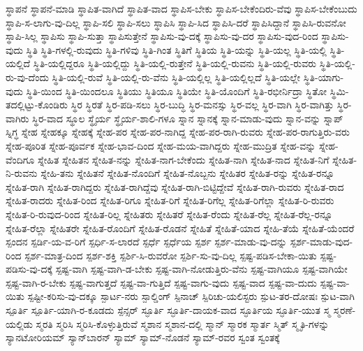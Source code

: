 {ಸ್ಥಾಪನೆ
ಸ್ಥಾಪನೆ-ಮಾಡಿ
ಸ್ಥಾಪಿತ-ವಾಗಿದೆ
ಸ್ಥಾಪಿತ-ವಾದ
ಸ್ಥಾಪಿಸ-ಬೇಕು
ಸ್ಥಾಪಿಸ-ಬೇಕೆಂದಿರು-ವೆವು
ಸ್ಥಾಪಿಸ-ಬೇಕೆಂಬುದು
ಸ್ಥಾಪಿ-ಸ-ಲಾಗು-ವು-ದಿಲ್ಲ
ಸ್ಥಾಪಿ-ಸಲಿ
ಸ್ಥಾಪಿ-ಸಲು
ಸ್ಥಾಪಿಸಿ
ಸ್ಥಾಪಿ-ಸಿದ
ಸ್ಥಾಪಿಸಿ-ದರೆ
ಸ್ಥಾಪಿಸಿದ್ದಾನೆ
ಸ್ಥಾಪಿಸಿ-ರುವನೋ
ಸ್ಥಾಪಿ-ಸಿಲ್ಲ
ಸ್ಥಾಪಿಸು
ಸ್ಥಾಪಿ-ಸುತ್ತಾ
ಸ್ಥಾಪಿಸುತ್ತೇನೆ
ಸ್ಥಾಪಿಸು-ವು-ದಕ್ಕೆ
ಸ್ಥಾಪಿಸು-ವು-ದರ
ಸ್ಥಾಪಿಸು-ವುದ-ರಿಂದ
ಸ್ಥಾಪಿಸು-ವುದು
ಸ್ಥಿತಿ
ಸ್ಥಿತಿ-ಗಳಲ್ಲಿ-ರುವುದು
ಸ್ಥಿತಿ-ಗಳಿವು
ಸ್ಥಿತಿ-ಗಿಂತ
ಸ್ಥಿತಿಗೆ
ಸ್ಥಿತಿಯ
ಸ್ಥಿತಿ-ಯನ್ನು
ಸ್ಥಿತಿ-ಯಲ್ಲ
ಸ್ಥಿತಿ-ಯಲ್ಲಿ
ಸ್ಥಿತಿ-ಯಲ್ಲಿದೆ
ಸ್ಥಿತಿ-ಯಲ್ಲಿದ್ದರೂ
ಸ್ಥಿತಿ-ಯಲ್ಲಿದ್ದು
ಸ್ಥಿತಿ-ಯಲ್ಲಿ-ರುತ್ತೇನೆ
ಸ್ಥಿತಿ-ಯಲ್ಲಿ-ರುವನು
ಸ್ಥಿತಿ-ಯಲ್ಲಿ-ರುವರು
ಸ್ಥಿತಿ-ಯಲ್ಲಿ-ರು-ವು-ದೆಂದು
ಸ್ಥಿತಿ-ಯಲ್ಲಿ-ರುವೆ
ಸ್ಥಿತಿ-ಯಲ್ಲಿ-ರು-ವೆನು
ಸ್ಥಿತಿ-ಯಲ್ಲಿಲ್ಲ
ಸ್ಥಿತಿ-ಯಲ್ಲಿಲ್ಲದೆ
ಸ್ಥಿತಿ-ಯಲ್ಲೇ
ಸ್ಥಿತಿ-ಯಾಗು-ವುದು
ಸ್ಥಿತಿ-ಯಿಂದ
ಸ್ಥಿತಿ-ಯಿಂದಲೂ
ಸ್ಥಿತಿಯು
ಸ್ಥಿತಿಯೂ
ಸ್ಥಿತಿಯೇ
ಸ್ಥಿತಿ-ಯೊಂದಿಗೆ
ಸ್ಥಿತಿ-ರಭೀರ್ನಿದ್ರಾ
ಸ್ಥಿತೋ
ಸ್ಥಿಮಿ-ತದಲ್ಲಿಟ್ಟು-ಕೊಂಡಿರು
ಸ್ಥಿರ
ಸ್ಥಿರತೆ
ಸ್ಥಿರ-ಪಡಿ-ಸಲು
ಸ್ಥಿರ-ಬುದ್ಧಿ
ಸ್ಥಿರ-ಮನಸ್ಸು
ಸ್ಥಿರ-ವಲ್ಲ
ಸ್ಥಿರ-ವಾಗಿ
ಸ್ಥಿರ-ವಾಗಿತ್ತು
ಸ್ಥಿರ-ವಾಗಿರು
ಸ್ಥಿರ-ವಾದ
ಸ್ಥೂಲ
ಸ್ಥೈರ್ಯ
ಸ್ಥೈರ್ಯ-ಶಾಲಿ-ಗಳೂ
ಸ್ನಾನ
ಸ್ನಾನಕ್ಕೆ
ಸ್ನಾನ-ಮಾಡು-ವುದು
ಸ್ನಾನ-ವನ್ನು
ಸ್ನಾಪ್
ಸ್ನಿಗ್ಧ
ಸ್ನೇಹ
ಸ್ನೇಹಕ್ಕೂ
ಸ್ನೇಹಕ್ಕೆ
ಸ್ನೇಹ-ಪರ
ಸ್ನೇಹ-ಪರ-ನಾಗಿದ್ದ
ಸ್ನೇಹ-ಪರ-ರಾಗಿ-ರುವರು
ಸ್ನೇಹ-ಪರ-ರಾಗುತ್ತಿರು-ವರು
ಸ್ನೇಹ-ಪೂರಿತ
ಸ್ನೇಹ-ಪೂರ್ವಕ
ಸ್ನೇಹ-ಭಾವ-ದಿಂದ
ಸ್ನೇಹ-ಮಯ-ವಾಗಿದ್ದರು
ಸ್ನೇಹ-ಮುದ್ರಿತ
ಸ್ನೇಹ-ವನ್ನು
ಸ್ನೇಹ-ವೆಂದಿಗೂ
ಸ್ನೇಹಿತ
ಸ್ನೇಹಿತನ
ಸ್ನೇಹಿತ-ನನ್ನು
ಸ್ನೇಹಿತ-ನಾಗ-ಬೇಕೆಂದು
ಸ್ನೇಹಿತ-ನಾಗಿ
ಸ್ನೇಹಿತ-ನಾದ
ಸ್ನೇಹಿತ-ನಿಗೆ
ಸ್ನೇಹಿತ-ನಿ-ರುವನು
ಸ್ನೇಹಿ-ತನು
ಸ್ನೇಹಿತನೆ
ಸ್ನೇಹಿತ-ನೊಂದಿಗೆ
ಸ್ನೇಹಿತ-ನೊಬ್ಬನು
ಸ್ನೇಹಿತರ
ಸ್ನೇಹಿತ-ರನ್ನು
ಸ್ನೇಹಿತ-ರನ್ನೂ
ಸ್ನೇಹಿತ-ರಾಗಿ
ಸ್ನೇಹಿತ-ರಾಗಿದ್ದರು
ಸ್ನೇಹಿತ-ರಾಗಿದ್ದೆವು
ಸ್ನೇಹಿತ-ರಾಗಿ-ಬಿಟ್ಟಿದ್ದೇವೆ
ಸ್ನೇಹಿತ-ರಾಗಿ-ರುವರು
ಸ್ನೇಹಿತ-ರಾದ
ಸ್ನೇಹಿತ-ರಾದರು
ಸ್ನೇಹಿತ-ರಿಂದ
ಸ್ನೇಹಿತ-ರಿಗೂ
ಸ್ನೇಹಿತ-ರಿಗೆ
ಸ್ನೇಹಿತ-ರಿಗೆಲ್ಲ
ಸ್ನೇಹಿತ-ರಿಗೆಲ್ಲಾ
ಸ್ನೇಹಿತ-ರಿ-ರುವರು
ಸ್ನೇಹಿತ-ರಿ-ರುವುದ-ರಿಂದ
ಸ್ನೇಹಿತ-ರಿಲ್ಲ
ಸ್ನೇಹಿತರು
ಸ್ನೇಹಿತರೆ
ಸ್ನೇಹಿತ-ರೆಂದು
ಸ್ನೇಹಿತ-ರೆಲ್ಲ
ಸ್ನೇಹಿತ-ರೆಲ್ಲ-ರನ್ನೂ
ಸ್ನೇಹಿತ-ರೆಲ್ಲಾ
ಸ್ನೇಹಿತರೇ
ಸ್ನೇಹಿತ-ರೊಂದಿಗೆ
ಸ್ನೇಹಿತ-ರೊಡನೆ
ಸ್ನೇಹಿತೆ
ಸ್ನೇಹಿತೆ-ಯಾದ
ಸ್ನೇಹಿ-ತೆಯೆ
ಸ್ನೇಹಿತೆ-ಯೆಂದರೆ
ಸ್ಪಂದನ
ಸ್ಪರ್ಡಿ-ಯ-ವ-ರಿಗೆ
ಸ್ಪರ್ಧಿ-ಸ-ಲಾರದೆ
ಸ್ಪರ್ಧೆ
ಸ್ಪರ್ಧೆಯ
ಸ್ಪರ್ಶ
ಸ್ಪರ್ಶ-ಮಾಡು-ವು-ದನ್ನು
ಸ್ಪರ್ಶ-ಮಾಡು-ವುದ-ರಿಂದ
ಸ್ಪರ್ಶ-ಮಾತ್ರ-ದಿಂದ
ಸ್ಪರ್ಶ-ಶಕ್ತಿ
ಸ್ಪರ್ಶಿ-ಸಿ-ರುವರೋ
ಸ್ಪರ್ಶಿ-ಸು-ವು-ದಿಲ್ಲ
ಸ್ಪಷ್ಟ-ಪಡಿಸ-ಬೇಕಾ-ಯಿತು
ಸ್ಪಷ್ಟ-ಪಡಿಸು-ವು-ದಕ್ಕೆ
ಸ್ಪಷ್ಟ-ವಾಗಿ
ಸ್ಪಷ್ಟ-ವಾಗಿ-ಡ-ಬೇಕು
ಸ್ಪಷ್ಟ-ವಾಗಿ-ನೋಡುತ್ತಿರು-ವೆನು
ಸ್ಪಷ್ಟ-ವಾಗಿಯೂ
ಸ್ಪಷ್ಟ-ವಾಗಿಯೇ
ಸ್ಪಷ್ಟ-ವಾಗಿ-ರ-ಬೇಕು
ಸ್ಪಷ್ಟ-ವಾಗುತ್ತದೆ
ಸ್ಪಷ್ಟ-ವಾ-ಗುತ್ತಿದೆ
ಸ್ಪಷ್ಟ-ವಾಗು-ವುದು
ಸ್ಪಷ್ಟ-ವಾದ
ಸ್ಪಷ್ಟ-ವಾ-ದುದು
ಸ್ಪಷ್ಟ-ವಾ-ಯಿತು
ಸ್ಪಷ್ಟೀ-ಕರಿಸು-ವು-ದಕ್ಕೂ
ಸ್ಪಾರ್ಟ-ನರು
ಸ್ಪಾಲ್ಡಿಂಗ್
ಸ್ಪಿನಾಚ್
ಸ್ಪಿರಿಚು-ಯಲಿಸ್ಟರು
ಸ್ಪುಟ-ತರ-ದೋಷಃ
ಸ್ಪುಟ-ವಾಗಿ
ಸ್ಪೂರ್ತಿ
ಸ್ಪೂರ್ತಿ-ಯಾಗಿ-ರ-ಕೂಡದು
ಸ್ಪೆನ್ಸರ್
ಸ್ಫೂರ್ತಿ
ಸ್ಫೂರ್ತಿ-ದಾಯಕ-ವಾದ
ಸ್ಫೂರ್ತಿಯ
ಸ್ಫೂರ್ತಿ-ಯುತ
ಸ್ಮ
ಸ್ಮರಣೆ-ಯಲ್ಲಿಡು
ಸ್ಮರತಿ
ಸ್ಮರಿಸಿ
ಸ್ಮರಿಸಿ-ಕೊಳ್ಳುತ್ತಿರುವೆ
ಸ್ಮಶಾನ
ಸ್ಮಶಾನ-ದಲ್ಲಿ
ಸ್ಮಾನ್
ಸ್ಮಾರಕ
ಸ್ಮಾರ್ತ
ಸ್ಮಿತ್
ಸ್ಮೃತಿ-ಗಳನ್ನು
ಸ್ಯಾನಟೋರಿಯಮ್
ಸ್ಯಾನ್‌ಬಾರನ್
ಸ್ಯಾಮ್
ಸ್ಯಾಮ್‌-ನೊಡನೆ
ಸ್ಯಾಮ್‌-ರವರ
ಸ್ವಂತ
ಸ್ವಂತಕ್ಕೆ
}
